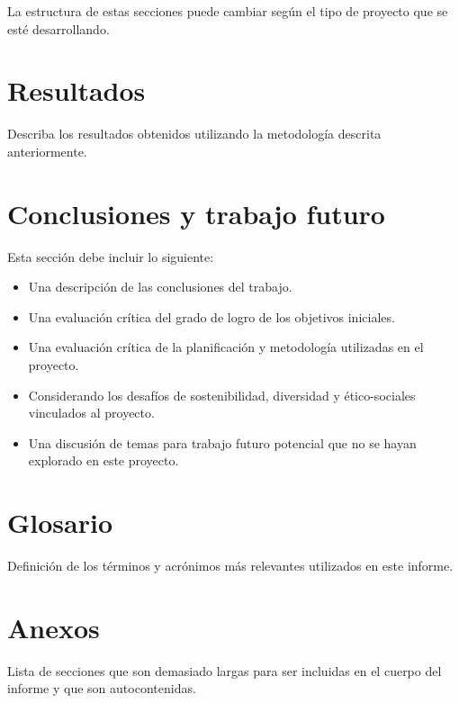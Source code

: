 \documentclass[12pt,a4paper,twoside]{book}
\begin{document}
La estructura de estas secciones puede cambiar según el tipo de proyecto que se esté desarrollando.

\section{Resultados}

Describa los resultados obtenidos utilizando la metodología descrita anteriormente.

\section{Conclusiones y trabajo futuro}

Esta sección debe incluir lo siguiente:

\begin{itemize}
    \item Una descripción de las conclusiones del trabajo.
    \item Una evaluación crítica del grado de logro de los objetivos iniciales.
    \item Una evaluación crítica de la planificación y metodología utilizadas en el proyecto.
    \item Considerando los desafíos de sostenibilidad, diversidad y ético-sociales vinculados al proyecto.
    \item Una discusión de temas para trabajo futuro potencial que no se hayan explorado en este proyecto.
\end{itemize}

\section{Glosario}

Definición de los términos y acrónimos más relevantes utilizados en este informe.




\section{Anexos}

Lista de secciones que son demasiado largas para ser incluidas en el cuerpo del informe y que son autocontenidas.
\end{document}
